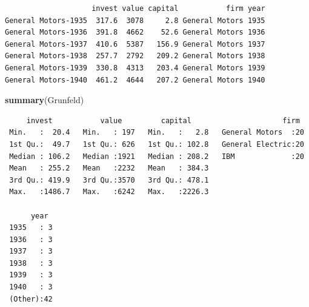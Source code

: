 \documentclass[12pt,brazil,oneside]{book}
\newenvironment{Shaded}{\begin{snugshade}}{\end{snugshade}}
\newcommand{\DataTypeTok}[1]{\textcolor[rgb]{0.13,0.29,0.53}{#1}}
\newcommand{\KeywordTok}[1]{\textcolor[rgb]{0.13,0.29,0.53}{\textbf{#1}}}
\newcommand{\NormalTok}[1]{#1}
\newcommand{\OperatorTok}[1]{\textcolor[rgb]{0.81,0.36,0.00}{\textbf{#1}}}
\newcommand{\StringTok}[1]{\textcolor[rgb]{0.31,0.60,0.02}{#1}}
\begin{document}
\begin{Shaded}
\end{Shaded}

\begin{verbatim}
                    invest value capital           firm year
General Motors-1935  317.6  3078     2.8 General Motors 1935
General Motors-1936  391.8  4662    52.6 General Motors 1936
General Motors-1937  410.6  5387   156.9 General Motors 1937
General Motors-1938  257.7  2792   209.2 General Motors 1938
General Motors-1939  330.8  4313   203.4 General Motors 1939
General Motors-1940  461.2  4644   207.2 General Motors 1940
\end{verbatim}

\begin{Shaded}
\begin{Highlighting}[]
\KeywordTok{summary}\NormalTok{(Grunfeld)}
\end{Highlighting}
\end{Shaded}

\begin{verbatim}
     invest           value         capital                     firm   
 Min.   :  20.4   Min.   : 197   Min.   :   2.8   General Motors  :20  
 1st Qu.:  49.7   1st Qu.: 626   1st Qu.: 102.8   General Electric:20  
 Median : 106.2   Median :1921   Median : 208.2   IBM             :20  
 Mean   : 255.2   Mean   :2232   Mean   : 384.3                        
 3rd Qu.: 419.9   3rd Qu.:3570   3rd Qu.: 478.1                        
 Max.   :1486.7   Max.   :6242   Max.   :2226.3                        
                                                                       
      year   
 1935   : 3  
 1936   : 3  
 1937   : 3  
 1938   : 3  
 1939   : 3  
 1940   : 3  
 (Other):42  
\end{verbatim}
\end{document}
